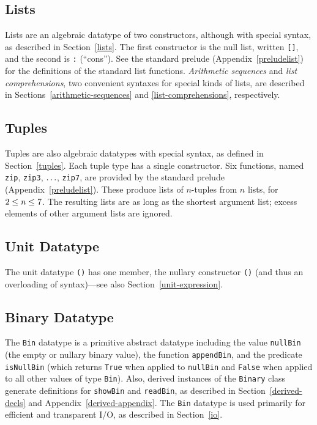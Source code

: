 \subsection{Lists}
\label{basic-lists}

Lists are an algebraic datatype of two constructors, although
with special syntax, as described in Section~\ref{lists}.
The first constructor is the null list, written \mbox{\tt []},
%
and the second is \mbox{\tt :} (``cons'').
See the standard prelude (Appendix~\ref{preludelist}) for the
definitions of the standard list functions.  {\em
Arithmetic sequences}
and {\em list comprehensions},
two convenient
syntaxes for special kinds of lists, are described in
Sections~\ref{arithmetic-sequences} and \ref{list-comprehensions},
respectively.

\subsection{Tuples}
\label{basic-tuples}

Tuples are also algebraic datatypes with special syntax, as defined
in Section~\ref{tuples}.  Each tuple type has a single constructor.
Six functions, named \mbox{\tt zip}, \mbox{\tt zip3}, \mbox{$\it \ldots $}, \mbox{\tt zip7}, are provided
%
%
%
%
%
%
by the standard prelude (Appendix~\ref{preludelist}).  These produce
lists of $n$-tuples from $n$ lists,
for $2 \leq n \leq 7\/$.  The resulting lists are as long as the
shortest argument list; excess elements of other argument lists are
ignored.

\subsection{Unit Datatype}
\label{basic-trivial}

The unit datatype \mbox{\tt ()} has one
member, the nullary constructor \mbox{\tt ()}
(and thus an overloading of syntax)---see also Section~\ref{unit-expression}.

\subsection{Binary Datatype}
\label{bin-type}

The \mbox{\tt Bin} datatype is a
primitive abstract datatype
including the value \mbox{\tt nullBin} (the empty or nullary
binary value), the function \mbox{\tt appendBin}, and the
predicate \mbox{\tt isNullBin}
(which returns \mbox{\tt True} when applied to \mbox{\tt nullBin} and \mbox{\tt False} when
applied to all other values of
type \mbox{\tt Bin}).  Also, derived instances of the \mbox{\tt Binary} class
generate definitions for \mbox{\tt showBin} and \mbox{\tt readBin}, as described in
Section~\ref{derived-decls} and Appendix~\ref{derived-appendix}.  The \mbox{\tt Bin}
datatype is used primarily for efficient and transparent I/O, as
described in Section~\ref{io}.


